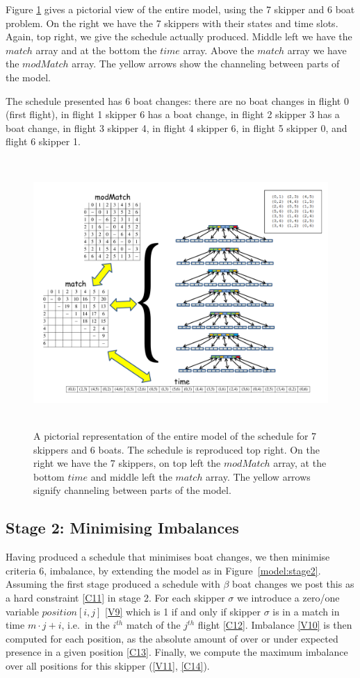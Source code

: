 \documentclass{llncs}
\newcommand{\match}{\mathit{match}}
\newcommand{\modMatch}{\mathit{modMatch}}
\newcommand{\timeVar}{\mathit{time}}
\begin{document}
\bigskip \noindent
Figure \ref{schedChanges} gives a pictorial view of the entire model, using the
7 skipper and 6 boat problem. On the right we have the 7 skippers with their
states and time slots. Again, top right, we give the schedule actually
produced.  Middle left we have the $\match$ array and at the bottom the
$\timeVar$ array. Above the $match$ array we have the $\modMatch$ array. The
yellow arrows show the channeling between parts of the model.

The schedule presented has 6 boat changes: there are no boat changes in flight
0 (first flight), in flight 1 skipper 6 has a boat change, in flight 2 skipper
3 has a boat change, in flight 3 skipper 4, in flight 4 skipper 6, in flight 5
skipper 0, and flight 6 skipper 1.

\begin{figure}[tb]
\centering
\includegraphics[height=10.2cm,width=13.2cm]{schedule.pdf}
\caption{A pictorial representation of the entire model of the schedule for 7
skippers and 6 boats. The schedule is reproduced top right. On the right we
have the 7 skippers, on top left the $\modMatch$ array, at the bottom
$\timeVar$ and middle left the $\match$ array. The yellow arrows signify
channeling between parts of the model.}
\label{schedChanges}
\end{figure}

\subsection{Stage 2: Minimising Imbalances}

Having produced a schedule that minimises boat changes, we then minimise
criteria 6, imbalance, by extending the model as in Figure~\ref{model:stage2}.
Assuming the first stage produced a schedule with $\beta$ boat changes we post
this as a hard constraint \eqref{C11} in stage 2. For each skipper $\sigma$ we
introduce a zero/one variable $position[{i,j}]$ \eqref{V9} which is 1 if and
only if skipper $\sigma$ is in a match in time $m \cdot j + i$, i.e.\ in the
$i^{th}$ match of the  $j^{th}$ flight \eqref{C12}. Imbalance \eqref{V10} is then computed
for each position, as the absolute amount of over or under
expected presence in a given position \eqref{C13}. Finally, we compute the
maximum imbalance over all positions for this skipper (\ref{V11}, \ref{C14}).
\end{document}
